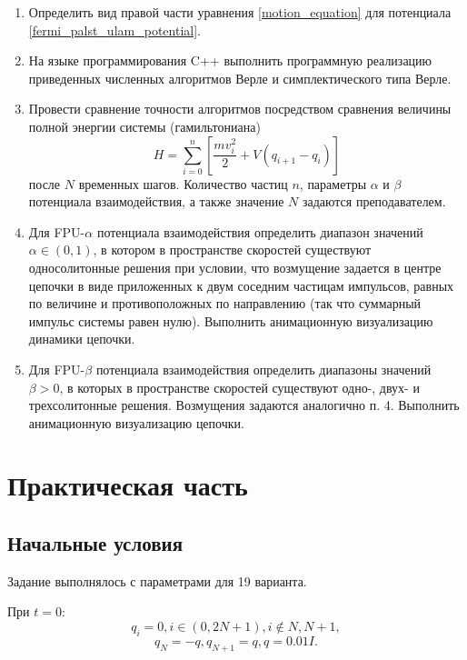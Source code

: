 \documentclass[14pt,a4paper]{extarticle}
\theoremstyle{plain}
\begin{document}
	\begin{enumerate}
		\item Определить вид правой части уравнения \eqref{motion_equation} для потенциала \eqref{fermi_palst_ulam_potential}.
		
		\item На языке программирования C++ выполнить программную реализацию приведенных численных алгоритмов Верле и симплектического типа Верле.
		
		\item Провести сравнение точности алгоритмов посредством сравнения величины полной энергии системы (гамильтониана)
		\begin{equation}
			H = \sum_{i=0}^{n} \left[ \frac{m v_i^2}{2} + V(q_{i+1}-q_i) \right]
			\label{hamiltonian}
			\nonumber
		\end{equation}
		после $N$ временных шагов. Количество частиц $n$, параметры $\alpha$ и $\beta$ потенциала взаимодействия, а также значение $N$ задаются преподавателем.
		
		\item Для FPU-$\alpha$ потенциала взаимодействия определить диапазон значений $\alpha \in (0,1)$, в котором в пространстве скоростей существуют односолитонные решения при условии, что возмущение задается в центре цепочки в виде приложенных к двум соседним частицам импульсов, равных по величине и противоположных по направлению (так что суммарный импульс системы равен нулю). Выполнить анимационную визуализацию динамики цепочки.
		
		\item Для FPU-$\beta$ потенциала взаимодействия определить диапазоны значений $\beta > 0$, в которых в пространстве скоростей существуют одно-, двух- и трехсолитонные решения. Возмущения задаются аналогично п. 4. Выполнить анимационную визуализацию цепочки.
		
	\end{enumerate}
	
	\newpage
	\section{Практическая часть}
	
	\subsection{Начальные условия}
	
	Задание выполнялось с параметрами для 19 варианта.
	
	При $t=0$:
	\[
		q_i=0,i\in(0,2N+1), i\notin {N,N+1},
	\]
	\[
		q_N=-q, q_{N+1}=q, q=0.01I.
	\]
\end{document}
